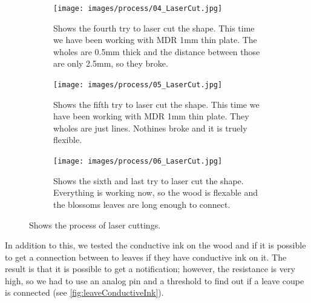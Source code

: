\documentclass[doc.tex]{subfiles}
\begin{document}
\begin{figure}[H]
            \begin{subfigure}{.45\textwidth}
                \centering
                \texttt{[image: images/process/04\_LaserCut.jpg]}
                \caption{Shows the fourth try to laser cut the shape. This time we have been
                         working with MDR 1mm thin plate. The wholes are 0.5mm thick and the 
                         distance between those are only 2.5mm, so they broke.}
                \label{fig:04_LaserCut}
                \vspace{6mm}
            \end{subfigure}
            \hspace{1mm}
            \begin{subfigure}{.45\textwidth}
                \centering
                \texttt{[image: images/process/05\_LaserCut.jpg]}
                \caption{Shows the fifth try to laser cut the shape. This time we have been
                         working with MDR 1mm thin plate. They wholes are just lines. Nothines
                         broke and it is truely flexible.}
                \label{fig:04_LaserCut}
                \vspace{6mm}
            \end{subfigure}
            \hspace{1mm}
            \begin{subfigure}{.45\textwidth}
                \centering
                \texttt{[image: images/process/06\_LaserCut.jpg]}
                \caption{Shows the sixth and last try to laser cut the shape. Everything is 
                working now, so the wood is flexable and the blossoms leaves are long enough
                to connect. }
                \label{fig:04_LaserCut}
                \vspace{6mm}
            \end{subfigure}
            \caption{Shows the process of laser cuttings.}
            \label{fig:laserCutTests}
        \end{figure}
        
        \noindent
        In addition to this, we tested the conductive ink on the wood and if it is possible 
        to get a connection between to leaves if they have conductive ink on it. The result is
        that it is possible to get a notification; however, the resistance is very high, so we 
        had to use an analog pin and a threshold to find out if a leave coupe is connected
        (see \ref{fig:leaveConductiveInk}).
\end{document}
